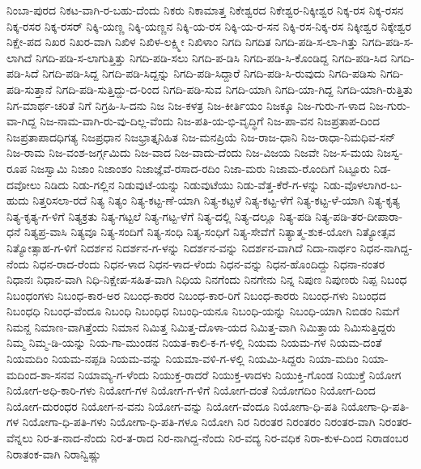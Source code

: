 ನಿಂಬಾ-ಪುರದ
ನಿಕಟ-ವಾಗಿ-ರ-ಬಹು-ದೆಂದು
ನಿಕರು
ನಿಕಾಮಾತ್ತ
ನಿಕೇಶ್ವರದ
ನಿಕೇಶ್ವರ-ನಿಕ್ಕೀಶ್ವರ
ನಿಕ್ಕ-ರಸ
ನಿಕ್ಕ-ರಸನ
ನಿಕ್ಕ-ರಸರ
ನಿಕ್ಕ-ರಸರ್
ನಿಕ್ಕಿ-ಯಣ್ಣ
ನಿಕ್ಕಿ-ಯಣ್ಣನ
ನಿಕ್ಕಿ-ಯ-ರಸ
ನಿಕ್ಕಿ-ಯ-ರ-ಸನ
ನಿಕ್ಕಿ-ರಸ-ನಿಕ್ಕ-ರಸ
ನಿಕ್ಕೀಶ್ವರ
ನಿಕ್ಕೇಶ್ವರ
ನಿಕ್ಷೇ-ಪದ
ನಿಖರ
ನಿಖರ-ವಾಗಿ
ನಿಖಿಳ
ನಿಖಿಳ-ಲಕ್ಷ್ಮೀ
ನಿಖಿಳಾಂ
ನಿಗದಿ
ನಿಗದಿತ
ನಿಗದಿ-ಪಡಿ-ಸ-ಲಾ-ಗಿತ್ತು
ನಿಗದಿ-ಪಡಿ-ಸ-ಲಾಗಿದೆ
ನಿಗದಿ-ಪಡಿ-ಸ-ಲಾಗುತ್ತಿತ್ತು
ನಿಗದಿ-ಪಡಿ-ಸಲು
ನಿಗದಿ-ಪ-ಡಿಸಿ
ನಿಗದಿ-ಪಡಿ-ಸಿ-ಕೊಂಡಿದ್ದ
ನಿಗದಿ-ಪಡಿ-ಸಿದ
ನಿಗದಿ-ಪಡಿ-ಸಿದೆ
ನಿಗದಿ-ಪಡಿ-ಸಿದ್ದ
ನಿಗದಿ-ಪಡಿ-ಸಿದ್ದನ್ನು
ನಿಗದಿ-ಪಡಿ-ಸಿದ್ದಾರೆ
ನಿಗದಿ-ಪಡಿ-ಸಿ-ರುವುದು
ನಿಗದಿ-ಪಡಿಸು
ನಿಗದಿ-ಪಡಿ-ಸುತ್ತಾನೆ
ನಿಗದಿ-ಪಡಿ-ಸುತ್ತಿದ್ದು-ದ-ರಿಂದ
ನಿಗದಿ-ಪಡಿ-ಸುವ
ನಿಗದಿ-ಯಾಗಿ
ನಿಗದಿ-ಯಾ-ಗಿದ್ದ
ನಿಗದಿ-ಯಾಗಿ-ರುತ್ತಿತು
ನಿಗ-ಮಾರ್ಥ-ಚರಿತೆ
ನಿಗೆ
ನಿಗ್ರಹಿ-ಸಿ-ದನು
ನಿಜ
ನಿಜ-ಕಳತ್ರ
ನಿಜ-ಕೀರ್ತಿಯಂ
ನಿಜಕ್ಕೂ
ನಿಜ-ಗುರು-ಗ-ಳಾದ
ನಿಜ-ಗುರು-ವಾ-ಗಿದ್ದ
ನಿಜ-ನಾಮ-ವಾಗಿ-ರು-ವು-ದಿಲ್ಲ-ವೆಂದು
ನಿಜ-ಪತಿ-ಯ-ಭಿ-ವೃದ್ಧಿಗೆ
ನಿಜ-ಪಾ-ವನ
ನಿಜಪ್ರತಾಪ-ದಿಂದ
ನಿಜಪ್ರತಾಪಾದಧಿಗತ್ಯ
ನಿಜಪ್ರಧಾನ
ನಿಜಭ್ರಾತ್ತೃನಿಹಿತ
ನಿಜ-ಮನಪ್ರಿಯೆ
ನಿಜ-ರಾಜ-ಧಾನಿ
ನಿಜ-ರಾಧಾ-ನಿಮಧಿವ-ಸನ್
ನಿಜ-ರಾಮ
ನಿಜ-ವಂಶ-ಜರ್ಗ್ಗಮಿದು
ನಿಜ-ವಾದ
ನಿಜ-ವಾದು-ದೆಂದು
ನಿಜ-ವಿಜಯ
ನಿಜವೇ
ನಿಜ-ಸ-ಮಯ
ನಿಜಸ್ವ-ರೂಪ
ನಿಜಸ್ವಾಮಿ
ನಿಜಾಂ
ನಿಜಾಂಶಂ
ನಿಜಾಜ್ಞೆವೆ-ರಸಾದ-ರದಿಂ
ನಿಜಾ-ಮರು
ನಿಜಾಮ-ರೊಂದಿಗೆ
ನಿಟ್ಟೂರು
ನಿಡ-ದವೋಲು
ನಿಡಿದು
ನಿಡು-ಗಲ್ಲಿನ
ನಿಡುವುಟೆ-ಯನ್ನು
ನಿಡುವುಟೆಯು
ನಿಡು-ವೆತ್ತ-ಕೆರೆ-ಗ-ಳನ್ನು
ನಿಡು-ವೊಳಲಾಗಿರ-ಬ-ಹುದು
ನಿತ್ತರಿಸಲಾ-ರದೆ
ನಿತ್ಯ
ನಿತ್ಯಂ
ನಿತ್ಯ-ಕಟ್ಟ-ಣೆ-ಯಾಗಿ
ನಿತ್ಯ-ಕಟ್ಟಳೆ
ನಿತ್ಯ-ಕಟ್ಟ-ಳೆಗೆ
ನಿತ್ಯ-ಕಟ್ಟ-ಳೆ-ಯಾಗಿ
ನಿತ್ಯ-ಕೃತ್ಯ
ನಿತ್ಯ-ಕೃತ್ಯ-ಗ-ಳಿಗೆ
ನಿತ್ಯಕ್ರತು
ನಿತ್ಯ-ಗಟ್ಟಲೆ
ನಿತ್ಯ-ಗಟ್ಟ-ಳೆಗೆ
ನಿತ್ಯ-ದಲ್ಲಿ
ನಿತ್ಯ-ದಲ್ಲೂ
ನಿತ್ಯ-ಪಡಿ
ನಿತ್ಯ-ಪಡಿ-ತರ-ದೀಪಾರಾ-ಧನೆ
ನಿತ್ಯಪ್ರ-ವಾಸಿ
ನಿತ್ಯವೂ
ನಿತ್ಯ-ಸಂದಿಗೆ
ನಿತ್ಯ-ಸಂಧಿ
ನಿತ್ಯ-ಸಂಧಿಗೆ
ನಿತ್ಯ-ಸೇವೆಗೆ
ನಿತ್ಯಾತ್ಮ-ಶುಕ-ಯೋಗಿ
ನಿತ್ಯೋತ್ಸವ
ನಿತ್ಯೋತ್ಸಾಹ-ಗ-ಳಿಗೆ
ನಿದರ್ಶನ
ನಿದರ್ಶನ-ಗ-ಳನ್ನು
ನಿದರ್ಶನ-ವನ್ನು
ನಿದರ್ಶನ-ವಾಗಿದೆ
ನಿದಾ-ನಾರ್ಥಂ
ನಿಧನ-ನಾಗಿದ್ದ-ನೆಂದು
ನಿಧನ-ರಾದ-ರೆಂದು
ನಿಧನ-ಳಾದ
ನಿಧನ-ಳಾದ-ಳೆಂದು
ನಿಧನ-ವನ್ನು
ನಿಧನ-ಹೊಂದಿದ್ದು
ನಿಧನಾ-ನಂತರ
ನಿಧಾನಃ
ನಿಧಾನ-ವಾಗಿ
ನಿಧಿ-ನಿಕ್ಷೇಪ-ಸಹಿತ-ವಾಗಿ
ನಿಧಿಯ
ನಿನಗೆಂದು
ನಿನಗೇನು
ನಿನ್ನ
ನಿಪುಣ
ನಿಪುಣರು
ನಿಪ್ಪ
ನಿಬಂಧ
ನಿಬಂಧಂಗಳು
ನಿಬಂಧ-ಕಾರ-ಅರ
ನಿಬಂಧ-ಕಾರರ
ನಿಬಂಧ-ಕಾರ-ರಿಗೆ
ನಿಬಂಧ-ಕಾರರು
ನಿಬಂಧ-ಗಳು
ನಿಬಂಧದ
ನಿಬಂಧಧಿ
ನಿಬಂಧ-ವೆಂದೂ
ನಿಬಂಧಿ
ನಿಬಂಧಿಧ
ನಿಬಂಧಿ-ಯನೂ
ನಿಬಂಧಿ-ಯನ್ನು
ನಿಬಂಧಿ-ಯಾಗಿ
ನಿಬಿಡಂ
ನಿಮಗೆ
ನಿಮನ್ದ
ನಿಮಾಣ-ವಾಗಿತ್ತೆಂದು
ನಿಮಾನ
ನಿಮಿತ್ತ
ನಿಮಿತ್ತ-ದೊಳಾ-ಯದ
ನಿಮಿತ್ತ-ವಾಗಿ
ನಿಮಿತ್ತಾಯ
ನಿಮಿಸುತ್ತಿದ್ದರು
ನಿಮ್ಮ
ನಿಮ್ಮ-ಡಿ-ಯನ್ನು
ನಿಯ-ಗಾ-ಮುಂಡನ
ನಿಯತ-ಕಾಲಿ-ಕ-ಗ-ಳಲ್ಲಿ
ನಿಯಮ
ನಿಯಮ-ಗಳ
ನಿಯಮ-ದಂತೆ
ನಿಯಮದಿಂ
ನಿಯಮ-ನಪ್ಪಡಿ
ನಿಯಮ-ವನ್ನು
ನಿಯಮಾ-ವಳಿ-ಗ-ಳಲ್ಲಿ
ನಿಯಮಿ-ಸಿದ್ದರು
ನಿಯಾ-ಮದಿಂ
ನಿಯಾ-ಮದಿಂದ-ಶಾ-ಸನವ
ನಿಯಾಮ್ಯ-ಗ-ಳೆಂದು
ನಿಯುಕ್ತ-ರಾದರೆ
ನಿಯುಕ್ತ-ಳಾದಳು
ನಿಯುಕ್ತಿ-ಗೊಂಡ
ನಿಯುಕ್ತೆ
ನಿಯೋಗ
ನಿಯೋಗ-ಅಧಿ-ಕಾರಿ-ಗಳು
ನಿಯೋಗ-ಗಳ
ನಿಯೋಗ-ಗ-ಳಿಗೆ
ನಿಯೋಗ-ದಂತೆ
ನಿಯೋಗದಿಂ
ನಿಯೋಗ-ದಿಂದ
ನಿಯೋಗ-ದುರಂಧರ
ನಿಯೋಗ-ನ-ವನು
ನಿಯೋಗ-ವನ್ನು
ನಿಯೋಗ-ವೆಂದೂ
ನಿಯೋಗಾ-ಧಿ-ಪತಿ
ನಿಯೋಗಾ-ಧಿ-ಪತಿ-ಗಳ
ನಿಯೋಗಾ-ಧಿ-ಪತಿ-ಗಳು
ನಿಯೋಗಾ-ಧಿ-ಪತಿ-ಗಳೂ
ನಿಯೋಗಿ
ನಿರ
ನಿರಂತರ
ನಿರಂತರಂ
ನಿರಂತರ-ವಾಗಿ
ನಿರಂತರ-ವೆನ್ನಲು
ನಿರ-ತ-ನಾದ-ನೆಂದು
ನಿರ-ತ-ರಾದ
ನಿರ-ನಾಗಿದ್ದ-ನೆಂದು
ನಿರ-ವದ್ಯ
ನಿರ-ವಧಿಕ
ನಿರಾ-ಕುಳ-ದಿಂದ
ನಿರಾಡಂಬರ
ನಿರಾತಂಕ-ವಾಗಿ
ನಿರಾನ್ವಿಷ್ಣು
